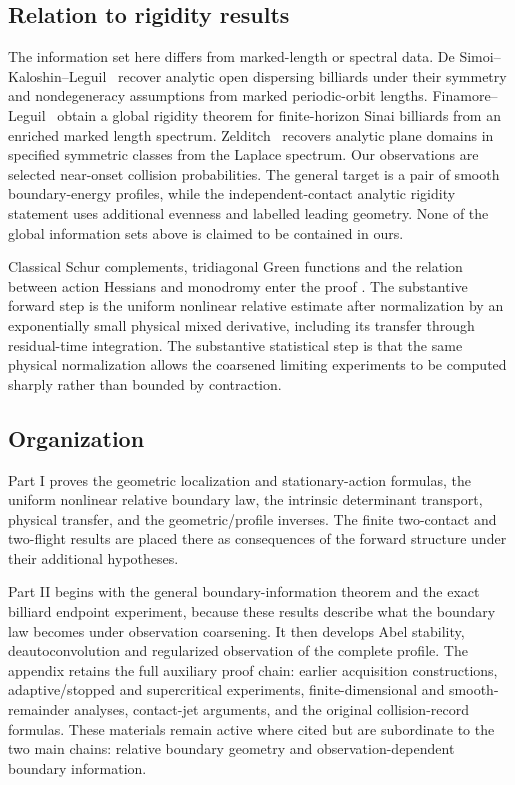 \subsection{Relation to rigidity results}
The information set here differs from marked-length or spectral data.
De Simoi--Kaloshin--Leguil~\cite{DSKL} recover analytic open dispersing
billiards under their symmetry and nondegeneracy assumptions from marked
periodic-orbit lengths.  Finamore--Leguil~\cite{FinamoreLeguil} obtain a
global rigidity theorem for finite-horizon Sinai billiards from an
enriched marked length spectrum.  Zelditch~\cite{Zelditch} recovers
analytic plane domains in specified symmetric classes from the Laplace
spectrum.  Our observations are selected near-onset collision
probabilities.  The general target is a pair of smooth boundary-energy
profiles, while the independent-contact analytic rigidity statement uses
additional evenness and labelled leading geometry.  None of the global
information sets above is claimed to be contained in ours.

Classical Schur complements, tridiagonal Green functions and the relation
between action Hessians and monodromy enter the proof
\cite{Hill,Meurant,Nabben}.  The substantive forward step is the uniform
nonlinear relative estimate after normalization by an exponentially small
physical mixed derivative, including its transfer through residual-time
integration.  The substantive statistical step is that the same physical
normalization allows the coarsened limiting experiments to be computed
sharply rather than bounded by contraction.

\subsection{Organization}
Part I proves the geometric localization and stationary-action formulas,
the uniform nonlinear relative boundary law, the intrinsic determinant
transport, physical transfer, and the geometric/profile inverses.  The
finite two-contact and two-flight results are placed there as consequences
of the forward structure under their additional hypotheses.

Part II begins with the general boundary-information theorem and the exact
billiard endpoint experiment, because these results describe what the
boundary law becomes under observation coarsening.  It then develops Abel
stability, deautoconvolution and regularized observation of the complete
profile.  The appendix retains the full auxiliary proof chain: earlier
acquisition constructions, adaptive/stopped and supercritical experiments,
finite-dimensional and smooth-remainder analyses, contact-jet arguments,
and the original collision-record formulas.  These materials remain
active where cited but are subordinate to the two main chains: relative
boundary geometry and observation-dependent boundary information.
